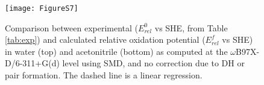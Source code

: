\documentclass[11pt,a4paper]{article}
\begin{document}
\begin{figure}[!h]
	\centering
	\texttt{[image: FigureS7]}
	\caption{Comparison between experimental ($E^0_{rel} $ vs SHE, from Table \ref{tab:exp}) and calculated relative oxidation potential ($E^f_{rel}$ vs SHE) in water (top) and acetonitrile (bottom)  as computed at the $\omega$B97X-D/6-311+G(d) level  using SMD, and no correction due to DH or pair formation.  The dashed line is a linear regression.}
	\label{fig:expvstheo}
\end{figure}

\clearpage



 

	
\end{document}
